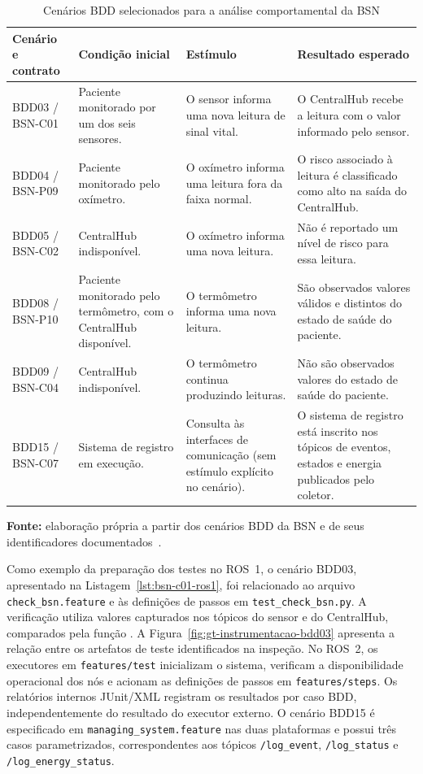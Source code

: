\begin{table}[htbp]
\centering
\caption{Cenários BDD selecionados para a análise comportamental da BSN}
\label{tab:cenarios-amostra-comportamental}
\footnotesize
\renewcommand{\arraystretch}{1.2}
\begin{tabularx}{\textwidth}{@{}p{2.45cm}XXX@{}}
\toprule
\textbf{Cenário e contrato} & \textbf{Condição inicial} & \textbf{Estímulo} & \textbf{Resultado esperado} \\
\midrule
BDD03 / BSN-C01 & Paciente monitorado por um dos seis sensores. & O sensor informa uma nova leitura de sinal vital. & O CentralHub recebe a leitura com o valor informado pelo sensor. \\
\addlinespace
BDD04 / BSN-P09 & Paciente monitorado pelo oxímetro. & O oxímetro informa uma leitura fora da faixa normal. & O risco associado à leitura é classificado como alto na saída do CentralHub. \\
\addlinespace
BDD05 / BSN-C02 & CentralHub indisponível. & O oxímetro informa uma nova leitura. & Não é reportado um nível de risco para essa leitura. \\
\addlinespace
BDD08 / BSN-P10 & Paciente monitorado pelo termômetro, com o CentralHub disponível. & O termômetro informa uma nova leitura. & São observados valores válidos e distintos do estado de saúde do paciente. \\
\addlinespace
BDD09 / BSN-C04 & CentralHub indisponível. & O termômetro continua produzindo leituras. & Não são observados valores do estado de saúde do paciente. \\
\addlinespace
BDD15 / BSN-C07 & Sistema de registro em execução. & Consulta às interfaces de comunicação (sem estímulo explícito no cenário). & O sistema de registro está inscrito nos tópicos de eventos, estados e energia publicados pelo coletor. \\
\bottomrule
\end{tabularx}
\par\smallskip
{\footnotesize\textbf{Fonte:} elaboração própria a partir dos cenários BDD da BSN e de seus identificadores documentados~\cite{Viana}.}
\end{table}

Como exemplo da preparação dos testes no ROS~1, o cenário BDD03, apresentado na Listagem~\ref{lst:bsn-c01-ros1}, foi relacionado ao arquivo \texttt{check\_bsn.feature} e às definições de passos em \texttt{test\_check\_bsn.py}. A verificação utiliza valores capturados nos tópicos do sensor e do CentralHub, comparados pela função . A Figura~\ref{fig:gt-instrumentacao-bdd03} apresenta a relação entre os artefatos de teste identificados na inspeção. No ROS~2, os executores em \texttt{features/test} inicializam o sistema, verificam a disponibilidade operacional dos nós e acionam as definições de passos em \texttt{features/steps}. Os relatórios internos JUnit/XML registram os resultados por caso BDD, independentemente do resultado do executor externo. O cenário BDD15 é especificado em \texttt{managing\_system.feature} nas duas plataformas e possui três casos parametrizados, correspondentes aos tópicos \texttt{/log\_event}, \texttt{/log\_status} e \texttt{/log\_energy\_status}.

